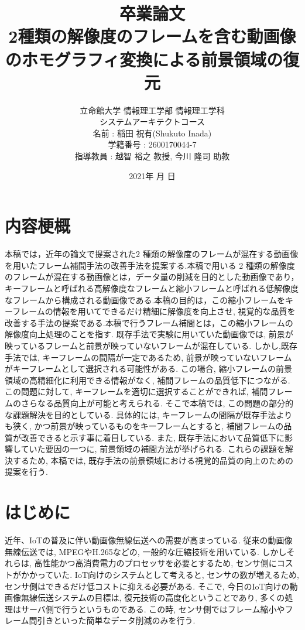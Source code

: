 \documentclass[a4paper,12pt]{jsreport}
\title{卒業論文\\2種類の解像度のフレームを含む動画像のホモグラフィ変換による前景領域の復元}
\author{立命館大学 情報理工学部 情報理工学科\\
システムアーキテクトコース\\
名前 : 稲田 祝有(Shukuto Inada)\\
学籍番号 : 2600170044-7\\
指導教員 : 越智 裕之 教授, 今川 隆司 助教\\
}
\date{2021年 月 日}
\begin{document}
\maketitle

\chapter*{内容梗概}
本稿では，近年の論文\cite{Uesaka}で提案された2 種類の解像度のフレームが混在する動画像を用いたフレーム補間手法の改善手法を提案する.本稿で用いる 2 種類の解像度のフレームが混在する動画像とは，データ量の削減を目的とした動画像であり，キーフレームと呼ばれる高解像度なフレームと縮小フレームと呼ばれる低解像度なフレームから構成される動画像である.本稿の目的は，この縮小フレームをキーフレームの情報を用いてできるだけ精細に解像度を向上させ, 視覚的な品質を改善する手法の提案である.本稿で行うフレーム補間とは，この縮小フレームの解像度向上処理のことを指す.
既存手法で実験に用いていた動画像では, 前景が映っているフレームと前景が映っていないフレームが混在している. しかし,既存手法では, キーフレームの間隔が一定であるため, 前景が映っていないフレームがキーフレームとして選択される可能性がある. この場合, 縮小フレームの前景領域の高精細化に利用できる情報がなく, 補間フレームの品質低下につながる. 
この問題に対して, キーフレームを適切に選択することができれば, 補間フレームのさらなる品質向上が可能と考えられる. 
そこで本稿では, この問題の部分的な課題解決を目的としている. 具体的には, キーフレームの間隔が既存手法よりも狭く, かつ前景が映っているものをキーフレームとすると, 補間フレームの品質が改善できると示す事に着目している. 
また, 既存手法において品質低下に影響していた要因の一つに, 前景領域の補間方法が挙げられる. 
これらの課題を解決するため, 本稿では,  既存手法の前景領域における視覚的品質の向上のための提案を行う. 


\tableofcontents
\listoffigures

\chapter{はじめに}

近年、IoTの普及に伴い動画像無線伝送への需要が高まっている. 従来の動画像無線伝送では, MPEGやH.265などの, 一般的な圧縮技術を用いている. しかしそれらは, 高性能かつ高消費電力のプロセッサを必要とするため, センサ側にコストがかかっていた. IoT向けのシステムとして考えると, センサの数が増えるため, センサ側はできるだけ低コストに抑える必要がある. そこで, 今日のIoT向けの動画像無線伝送システムの目標は, 復元技術の高度化ということであり, 多くの処理はサーバ側で行うというものである. この時, センサ側ではフレーム縮小やフレーム間引きといった簡単なデータ削減のみを行う.
\end{document}
